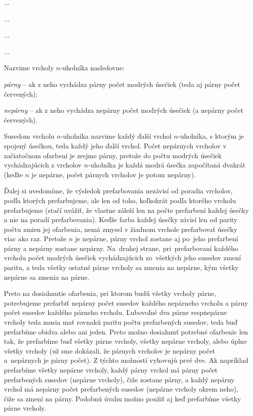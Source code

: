 {%
...}

{%
...}

{%
...}

{%
...}

{%
Nazvime vrcholy $n$-uholníka nasledovne:

{\it párny} -- ak z neho vychádza párny počet
modrých úsečiek (teda aj párny počet červených);

{\it nepárny} -- ak z neho vychádza nepárny počet modrých úsečiek
(a nepárny počet červených).

Susedom vrcholu $n$-uholníka nazvime
každý ďalší vrchol $n$-uholníka, s ktorým je spojený úsečkou, teda
každý jeho ďalší vrchol.
Počet nepárnych vrcholov v začiatočnom ofarbení je zrejme párny,
pretože do počtu modrých úsečiek vychádzajúcich z vrcholov $n$-uholníka
je každá modrá úsečka započítaná dvakrát (keďže $n$ je nepárne, počet
párnych vrcholov je potom nepárny).

Ďalej si uvedomíme, že výsledok prefarbovania nezávisí od poradia
vrcholov, podľa ktorých prefarbujeme, ale len od toho, koľkokrát
podľa ktorého vrcholu prefarbujeme (stačí uvážiť, že vlastne záleží len
na počte prefarbení každej úsečky a nie na poradí prefarbovania).
Keďže farba každej úsečky závisí len od parity počtu zmien jej
ofarbenia, nemá zmysel v žiadnom vrchole prefarbovať úsečky viac ako raz.
Pretože $n$ je nepárne,
párny vrchol zostane aj po~jeho prefarbení párny a nepárny zostane nepárny.
Na~druhej strane, pri~prefarbovaní každého vrcholu počet modrých úsečiek
vychádzajúcich zo~všetkých jeho susedov zmení paritu, a teda všetky
ostatné párne vrcholy sa zmenia na nepárne, kým
všetky nepárne sa zmenia na párne.

Preto na dosiahnutie ofarbenia, pri ktorom budú všetky vrcholy párne,
potrebujeme prefarbiť nepárny počet susedov každého nepárneho vrcholu a
párny počet susedov každého párneho vrcholu.
Ľubovoľné dva párne resp\. nepárne vrcholy teda musia mať rovnakú
paritu počtu prefarbených susedov, teda buď prefarbíme obidva alebo ani
jeden. Preto možno dosiahnuť potrebné ofarbenie len tak, že prefarbíme
buď všetky párne vrcholy, všetky nepárne vrcholy, alebo úplne všetky
vrcholy (už sme dokázali, že párnych vrcholov je nepárny počet
a~nepárnych je párny počet). Z týchto možností vyhovujú prvé dve. Ak
napríklad prefarbíme všetky nepárne vrcholy, každý párny
vrchol má párny počet prefarbených susedov (nepárne vrcholy), čiže
zostane párny, a každý nepárny vrchol má nepárny počet prefarbených
susedov (nepárne vrcholy okrem neho), čiže sa zmení na párny.
Podobnú úvahu možno použiť aj keď prefarbíme všetky párne vrcholy.

}
